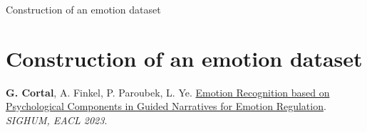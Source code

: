 \documentclass[handout,10pt]{beamer}
\begin{document}
\begin{frame}{}
\Large
\begin{center}
    Construction of an emotion dataset
    \section{Construction of an emotion dataset}

    \vspace{1.5cm}
\end{center}

\footnotesize

\textbf{G. Cortal}, A. Finkel, P. Paroubek, L. Ye. \href{https://aclanthology.org/2023.latechclfl-1.8/}{Emotion Recognition based on Psychological Components in Guided Narratives for Emotion Regulation}. \textit{SIGHUM, EACL 2023}.%
\end{frame}
\end{document}
